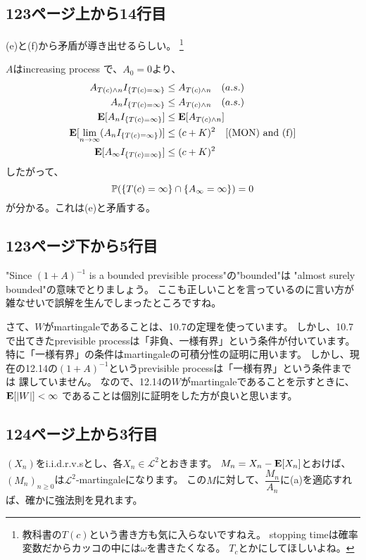   \subsection{123ページ上から14行目}
    (e)と(f)から矛盾が導き出せるらしい。
    \footnote{教科書の$T(c)$という書き方も気に入らないですねえ。
    stopping timeは確率変数だからカッコの中には$\omega$を書きたくなる。
    $T_c$とかにしてほしいよね。}

    $A$はincreasing process で、$A_0 = 0$より、
    \begin{align*}
      A_{T(c) \wedge n}I_{\{T(c) = \infty\}} &\leq A_{T(c) \wedge n}\quad (a.s.)\\
      A_{n}I_{\{T(c) = \infty\}} &\leq A_{T(c) \wedge n}\quad (a.s.)\\
      {\mathbf{E}}[A_{n}I_{\{T(c) = \infty\}}] &\leq {\mathbf{E}}[A_{T(c) \wedge n}]\\
      {\mathbf{E}}[\lim_{n \to \infty}(A_{n}I_{\{T(c) = \infty\}})] &\leq (c + K)^2 \quad \text{[(MON) and (f)]}\\
      {\mathbf{E}}[A_{\infty}I_{\{T(c) = \infty\}}] &\leq (c + K)^2
    \end{align*}
    したがって、
    \[{\mathbb{P}}(\{T(c) = \infty\} \cap \{A_{\infty} = \infty\}) = 0\]
    が分かる。これは(e)と矛盾する。

  \subsection{123ページ下から5行目}
    "Since $(1 + A)^{-1}$ is a bounded previsible process"の"bounded"は
    "almost surely bounded"の意味でとりましょう。
    ここも正しいことを言っているのに言い方が雑なせいで誤解を生んでしまったところですね。

    さて、$W$がmartingaleであることは、10.7の定理を使っています。
    しかし、10.7で出てきたprevisible processは「非負、一様有界」という条件が付いています。
    特に「一様有界」の条件はmartingaleの可積分性の証明に用います。
    しかし、現在の12.14の$(1 + A)^{-1}$というprevisible processは「一様有界」という条件までは
    課していません。
    なので、12.14の$W$がmartingaleであることを示すときに、${\mathbf{E}}[|W|] < \infty$
    であることは個別に証明をした方が良いと思います。

  \subsection{124ページ上から3行目}
    $(X_n)$をi.i.d.r.v.sとし、各$X_n \in \mathcal{L}^2$とおきます。
    $M_n = X_n - {\mathbf{E}}[X_n]$とおけば、$(M_n)_{n \ge 0}$は$\mathcal{L}^2$-martingaleになります。
    この$M$に対して、$\dfrac{M_n}{A_n}$に(a)を適応すれば、確かに強法則を見れます。

